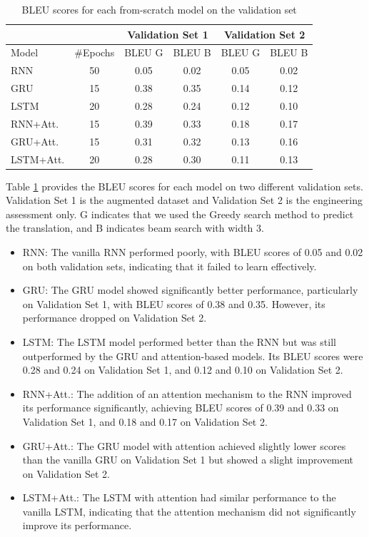 \begin{table}[H]
	\centering
	\begin{tabular}{@{}lccccc@{}}
		\cmidrule(l){3-6}
		\multicolumn{2}{l}{} & \multicolumn{2}{c}{Validation Set 1} & \multicolumn{2}{c}{Validation Set 2} \\ \midrule
		Model     & \#Epochs & BLEU G          & BLEU B         & BLEU G          & BLEU B         \\ \midrule
		RNN       & 50       & 0.05            & 0.02           & 0.05            & 0.02           \\
		GRU       & 15       & 0.38            & 0.35           & 0.14            & 0.12           \\
		LSTM      & 20       & 0.28            & 0.24           & 0.12            & 0.10           \\
		RNN+Att.  & 15       & 0.39            & 0.33           & 0.18            & 0.17           \\
		GRU+Att.  & 15       & 0.31            & 0.32           & 0.13            & 0.16           \\
		LSTM+Att. & 20       & 0.28            & 0.30           & 0.11            & 0.13           \\ \bottomrule
	\end{tabular}
	\caption{BLEU scores for each from-scratch model on the validation set}
	\label{tab:tab1}
\end{table}

Table \ref{tab:tab1} provides the BLEU scores for each model on two different validation sets. Validation Set 1 is the augmented dataset and Validation Set 2 is the engineering assessment only. G indicates that we used the Greedy search method to predict the translation, and B indicates beam search with width 3.

\begin{itemize}
	\item RNN: The vanilla RNN performed poorly, with BLEU scores of 0.05 and 0.02 on both validation sets, indicating that it failed to learn effectively.
	\item GRU: The GRU model showed significantly better performance, particularly on Validation Set 1, with BLEU scores of 0.38 and 0.35. However, its performance dropped on Validation Set 2.
	\item LSTM: The LSTM model performed better than the RNN but was still outperformed by the GRU and attention-based models. Its BLEU scores were 0.28 and 0.24 on Validation Set 1, and 0.12 and 0.10 on Validation Set 2.
	\item RNN+Att.: The addition of an attention mechanism to the RNN improved its performance significantly, achieving BLEU scores of 0.39 and 0.33 on Validation Set 1, and 0.18 and 0.17 on Validation Set 2.
	\item GRU+Att.: The GRU model with attention achieved slightly lower scores than the vanilla GRU on Validation Set 1 but showed a slight improvement on Validation Set 2.
	\item LSTM+Att.: The LSTM with attention had similar performance to the vanilla LSTM, indicating that the attention mechanism did not significantly improve its performance.
\end{itemize}

